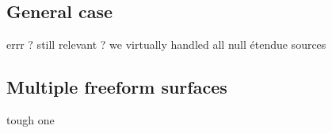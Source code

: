 

%

%

\subsection{General case}

errr ? still relevant ? we virtually handled all null étendue sources

\subsection{Multiple freeform surfaces}

tough one

